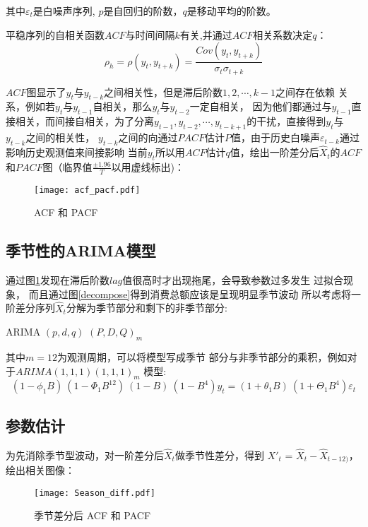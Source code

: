 \documentclass[12pt,a4paper]{nmmcm}
\begin{document}
其中\(\varepsilon_t\)是白噪声序列, \(p\)是自回归的阶数，\(q\)是移动平均的阶数。

平稳序列的自相关函数\(ACF\)与时间间隔\(k\)有关,并通过\(ACF\)相关系数决定\(q\)：
\begin{equation}
  \rho_h = \rho(y_t,y_{t+k}) =\frac{Cov(y_t,y_{t+k})}{\sigma_t \sigma_{t+k}}
\end{equation}

\(ACF\)图显示了\(y_t\)与\(y_{t-k}\)之间相关性，但是滞后阶数\(1,2,\cdots,k-1\)之间存在依赖
关系，例如若\(y_t\)与\(y_{t-1}\)自相关，那么\(y_t\)与\(y_{t-2}\)一定自相关，
因为他们都通过与\(y_{t-1}\)直接相关，而间接自相关，为了分离\(y_{t-1},
y_{t-2},\cdots,y_{t-k+1}\)的干扰，直接得到\(y_t\)与\(y_{t-k}\)之间的相关性，
\(y_{t-k}\)之间的向通过\(PACF\)估计\(P\)值，由于历史白噪声\(\varepsilon_{t-k}\)通过影响历史观测值来间接影响
当前\(y_t\)所以用\(ACF\)估计\(q\)值，绘出一阶差分后\(\hat{X}_t\)的\(ACF\)和\(PACF\)图（临界值\(\frac{\pm1.96}{T}\)以用虚线标出)：
\begin{figure}[H] %
  \centering %
  \texttt{[image: acf\_pacf.pdf]} %
  \caption{ACF 和 PACF} %
  \label{acf_pacf} %
  \end{figure} 
  \subsection{季节性的ARIMA模型}
  通过图\ref{acf_pacf}发现在滞后阶数\(lag\)值很高时才出现拖尾，会导致参数过多发生
  过拟合现象， 而且通过图\ref{decompose}得到消费总额应该是呈现明显季节波动
  所以考虑将一阶差分序列\(\hat{X}_t\)分解为季节部分和剩下的非季节部分:
\begin{center}
  ARIMA\;\;\;\;	\((p, d, q)\)	\;\;\;\;\; \((P, D, Q)_{m}\) \label{Season_decompose}
\end{center}

其中\(m=12\)为观测周期，可以将模型写成季节
部分与非季节部分的乘积，例如对于\(ARIMA(1,1,1)(1,1,1)_m\)
模型:
\begin{equation}
  (1 - \phi_{1}B)~(1 - \Phi_{1}B^{12})~(1 - B)~(1 - B^{4})y_{t} = (1 + \theta_{1}B)~ (1 + \Theta_{1}B^{4})\varepsilon_{t}
\end{equation}

 \subsection{参数估计}
 为先消除季节型波动，对一阶差分后\(\hat{X}_t\)做季节性差分，得到
 \(X'_{t}\) = \(\hat{X}_t-\hat{X}_{t-12)}\)，绘出相关图像：
 \begin{figure}[H] %
  \centering %
  \texttt{[image: Season\_diff.pdf]} %
  \caption{季节差分后 ACF 和 PACF} %
  \label{season_diff} %
  \end{figure}
\end{document}
